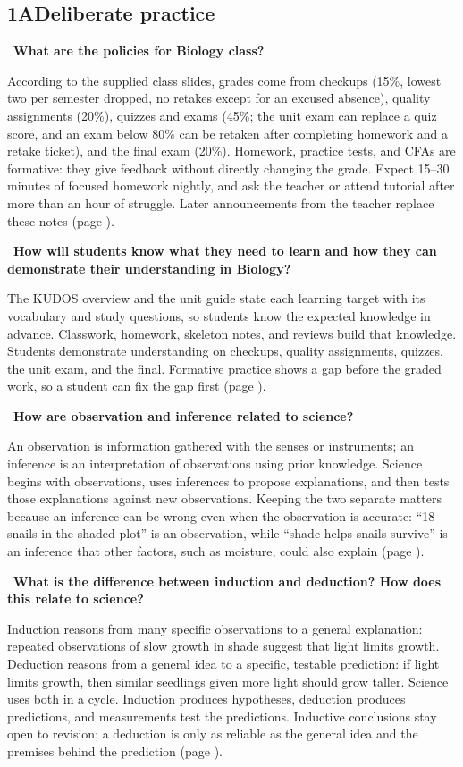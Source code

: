 \documentclass[11pt,letterpaper]{article}
\newcommand{\sq}[1]{\par\Needspace{6\baselineskip}\medskip{\color{forest}\textbf{Q.}}\ \textbf{#1}\par\smallskip}
\newcommand{\ans}[1]{#1\par}
\begin{document}
\subsection*{1A\quad Deliberate practice}
\sq{What are the policies for Biology class?}
\ans{According to the supplied class slides, grades come from checkups (15\%, lowest two per semester dropped, no retakes except for an excused absence), quality assignments (20\%), quizzes and exams (45\%; the unit exam can replace a quiz score, and an exam below 80\% can be retaken after completing homework and a retake ticket), and the final exam (20\%). Homework, practice tests, and CFAs are formative: they give feedback without directly changing the grade. Expect 15--30 minutes of focused homework nightly, and ask the teacher or attend tutorial after more than an hour of struggle. Later announcements from the teacher replace these notes (page \pageref{classroom}).}
\sq{How will students know what they need to learn and how they can demonstrate their understanding in Biology?}
\ans{The KUDOS overview and the unit guide state each learning target with its vocabulary and study questions, so students know the expected knowledge in advance. Classwork, homework, skeleton notes, and reviews build that knowledge. Students demonstrate understanding on checkups, quality assignments, quizzes, the unit exam, and the final. Formative practice shows a gap before the graded work, so a student can fix the gap first (page \pageref{onea}).}
\sq{How are observation and inference related to science?}
\ans{An observation is information gathered with the senses or instruments; an inference is an interpretation of observations using prior knowledge. Science begins with observations, uses inferences to propose explanations, and then tests those explanations against new observations. Keeping the two separate matters because an inference can be wrong even when the observation is accurate: ``18 snails in the shaded plot'' is an observation, while ``shade helps snails survive'' is an inference that other factors, such as moisture, could also explain (page \pageref{onea}).}
\sq{What is the difference between induction and deduction? How does this relate to science?}
\ans{Induction reasons from many specific observations to a general explanation: repeated observations of slow growth in shade suggest that light limits growth. Deduction reasons from a general idea to a specific, testable prediction: if light limits growth, then similar seedlings given more light should grow taller. Science uses both in a cycle. Induction produces hypotheses, deduction produces predictions, and measurements test the predictions. Inductive conclusions stay open to revision; a deduction is only as reliable as the general idea and the premises behind the prediction (page \pageref{classroom}).}
\end{document}

